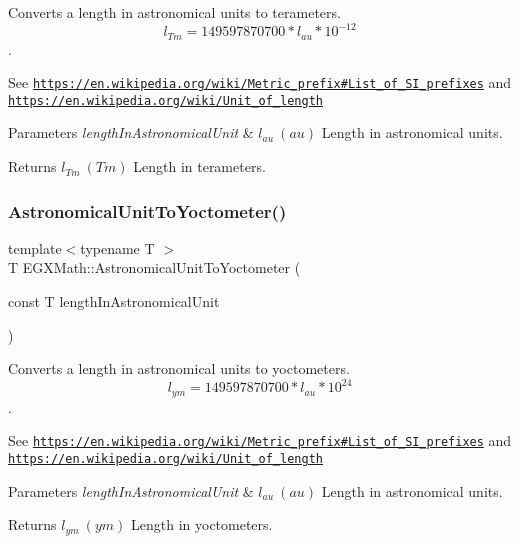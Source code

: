 Converts a length in astronomical units to terameters. \[ l_{Tm}=149597870700 * l_{au} * 10^{-12} \]. 

See \href{https://en.wikipedia.org/wiki/Metric_prefix#List_of_SI_prefixes}{\tt https\+://en.\+wikipedia.\+org/wiki/\+Metric\+\_\+prefix\#\+List\+\_\+of\+\_\+\+S\+I\+\_\+prefixes} and \href{https://en.wikipedia.org/wiki/Unit_of_length}{\tt https\+://en.\+wikipedia.\+org/wiki/\+Unit\+\_\+of\+\_\+length} 
\begin{DoxyParams}{Parameters}
{\em length\+In\+Astronomical\+Unit} & $ l_{au}\ (au)$ Length in astronomical units. \\
\hline
\end{DoxyParams}
\begin{DoxyReturn}{Returns}
$ l_{Tm}\ (Tm)$ Length in terameters. 
\end{DoxyReturn}
\mbox{\label{group___e_g_x_math-_conversions-_length_conversions-_astronomical-_astronomical_unit-_s_i_gab3a722bc0fc1b42aeeec0683351a3181}} 
\subsubsection{\texorpdfstring{Astronomical\+Unit\+To\+Yoctometer()}{AstronomicalUnitToYoctometer()}}
{\footnotesize\ttfamily template$<$typename T $>$ \\
T E\+G\+X\+Math\+::\+Astronomical\+Unit\+To\+Yoctometer (\begin{DoxyParamCaption}\item[{const T}]{length\+In\+Astronomical\+Unit }\end{DoxyParamCaption})}



Converts a length in astronomical units to yoctometers. \[ l_{ym}=149597870700 * l_{au} * 10^{24} \]. 

See \href{https://en.wikipedia.org/wiki/Metric_prefix#List_of_SI_prefixes}{\tt https\+://en.\+wikipedia.\+org/wiki/\+Metric\+\_\+prefix\#\+List\+\_\+of\+\_\+\+S\+I\+\_\+prefixes} and \href{https://en.wikipedia.org/wiki/Unit_of_length}{\tt https\+://en.\+wikipedia.\+org/wiki/\+Unit\+\_\+of\+\_\+length} 
\begin{DoxyParams}{Parameters}
{\em length\+In\+Astronomical\+Unit} & $ l_{au}\ (au)$ Length in astronomical units. \\
\hline
\end{DoxyParams}
\begin{DoxyReturn}{Returns}
$ l_{ym}\ (ym)$ Length in yoctometers. 
\end{DoxyReturn}
\mbox{\label{group___e_g_x_math-_conversions-_length_conversions-_astronomical-_astronomical_unit-_s_i_ga4cb2d4b1c5fef83c15a4737cef4b22e2}} 
